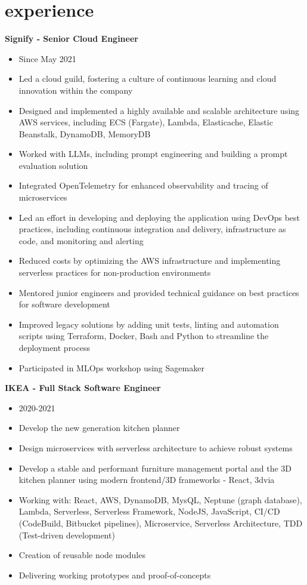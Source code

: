 \documentclass[]{friggeri-cv}
\begin{document}
\section{experience}

\textbf{Signify - Senior Cloud Engineer}
\begin{itemize}
  \item Since May 2021
  \item Led a cloud guild, fostering a culture of continuous learning and cloud innovation within the company
  \item Designed and implemented a highly available and scalable architecture using AWS services, including ECS (Fargate), Lambda, Elasticache, Elastic Beanstalk, DynamoDB, MemoryDB
  \item Worked with LLMs, including prompt engineering and building a prompt evaluation solution
  \item Integrated OpenTelemetry for enhanced observability and tracing of microservices
  \item Led an effort in developing and deploying the application using DevOps best practices, including continuous integration and delivery, infrastructure as code, and monitoring and alerting
  \item Reduced costs by optimizing the AWS infrastructure and implementing serverless practices for non-production environments
  \item Mentored junior engineers and provided technical guidance on best practices for software development
  \item Improved legacy solutions by adding unit tests, linting and automation scripts using Terraform, Docker, Bash and Python to streamline the deployment process
  \item Participated in MLOps workshop using Sagemaker
\end{itemize}

\textbf{IKEA - Full Stack Software Engineer}
\begin{itemize}
  \item 2020-2021
  \item Develop the new generation kitchen planner
  \item Design microservices with serverless architecture to achieve robust systems
  \item Develop a stable and performant furniture management portal and the 3D kitchen planner using modern frontend/3D frameworks - React, 3dvia
  \item Working with: React, AWS, DynamoDB, MysQL, Neptune (graph database), Lambda, Serverless, Serverless Framework, NodeJS, JavaScript, CI/CD (CodeBuild, Bitbucket pipelines), Microservice, Serverless Architecture, TDD (Test-driven development)
  \item Creation of reusable node modules
  \item Delivering working prototypes and proof-of-concepts
\end{itemize}
\end{document}

